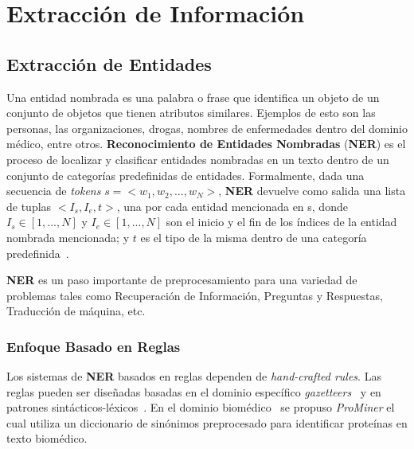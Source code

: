 \chapter{Extracción de Información}\label{chapter:information_extraction}

\section{Extracción de Entidades}

Una entidad nombrada es una palabra o frase que identifica un objeto de un conjunto de objetos que tienen atributos similares. Ejemplos de esto son las personas, las organizaciones, drogas, nombres de enfermedades dentro del dominio m\'edico, entre otros. \textbf{Reconocimiento de Entidades Nombradas} (\textbf{NER}) es el proceso de localizar y clasificar entidades nombradas en un texto dentro de un conjunto de categor\'ias predefinidas de entidades.
Formalmente, dada una secuencia de \emph{tokens} $s=<w_1, w_2, ..., w_N >$, \textbf{NER} devuelve como salida una lista de tuplas $<I_s, I_e, t>$, una por cada entidad mencionada en s, donde $I_s \in [1,...,N]$ y $I_e \in [1,...,N]$ son el inicio y el fin de los \'indices de la entidad nombrada mencionada; y $t$ es el tipo de la misma dentro de una categor\'ia predefinida~\cite{li2018survey}. 

\textbf{NER} es un paso importante de preprocesamiento para una variedad de problemas tales como Recuperaci\'on de Informaci\'on, Preguntas y Respuestas, Traducci\'on de m\'aquina, etc.


\subsection{Enfoque Basado en Reglas}

Los sistemas de \textbf{NER} basados en reglas dependen de \emph{hand-crafted rules}. Las reglas pueden ser dise\~nadas basadas en el dominio espec\'ifico \emph{gazetteers}~\cite{etzioni2005unsupervised} y en patrones sint\'acticos-l\'exicos~\cite{zhang2013unsupervised}. En el dominio biom\'edico~\cite{hanisch2005prominer} se propuso \emph{ProMiner} el cual utiliza un diccionario de sin\'onimos preprocesado para identificar prote\'inas en texto biom\'edico.

